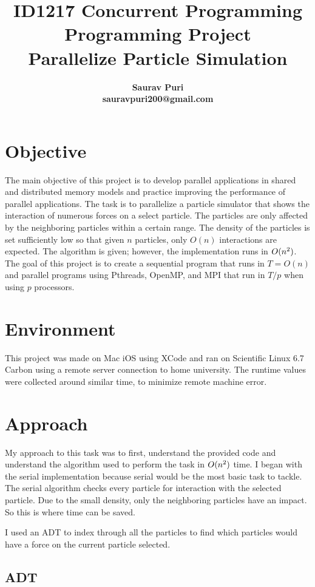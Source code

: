 \documentclass[12pt,a4paper]{article}
\title{
    {\normalsize\sc ID1217 Concurrent Programming} \\ 
    {\large Programming Project} \\
    Parallelize Particle Simulation
}
\author{
    \bf Saurav Puri \\
    \bf  sauravpuri200@gmail.com\\
}
\begin{document}
\maketitle

\section{Objective}
The main objective of this project is to develop parallel applications in shared and distributed memory models and practice improving the performance of parallel applications. The task is to parallelize a particle simulator that shows the interaction of numerous forces on a select particle. The particles are only affected by the neighboring particles within a certain range. The density of the particles is set sufficiently low so that given $n$ particles, only $O(n)$ interactions are expected. The algorithm is given; however, the implementation runs in $O(n\textsuperscript{2})$. The goal of this project is to create a sequential program that runs in $T = O(n)$ and parallel programs using Pthreads, OpenMP, and MPI that run in $T/p$ when using $p$ processors. 

\section{Environment}
This project was made on Mac iOS using XCode and ran on Scientific Linux 6.7 Carbon using a remote server connection to home university. The runtime values were collected around similar time, to minimize remote machine error.

\section{Approach}
My approach to this task was to first, understand the provided code and understand the algorithm used to perform the task in $O(n\textsuperscript{2})$ time. I began with the serial implementation because serial would be the most basic task to tackle. The serial algorithm checks every particle for interaction with the selected particle. Due to the small density, only the neighboring particles have an impact. So this is where time can be saved.

I used an ADT to index through all the particles to find which particles would have a force on the current particle selected.

\subsection{ADT}
\end{document}
